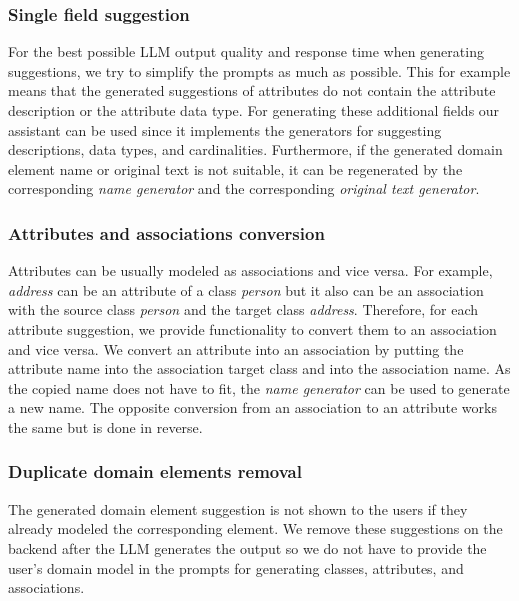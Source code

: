 \subsubsection{Single field suggestion}

For the best possible LLM output quality and response time when generating suggestions, we try to simplify the prompts as much as possible. This for example means that the generated suggestions of attributes do not contain the attribute description or the attribute data type. For generating these additional fields our assistant can be used since it implements the generators for suggesting descriptions, data types, and cardinalities. Furthermore, if the generated domain element name or original text is not suitable, it can be regenerated by the corresponding \emph{name generator} and the corresponding \emph{original text generator}.


\subsubsection{Attributes and associations conversion}
\label{sec:attributes_and_associations_conversion}

Attributes can be usually modeled as associations and vice versa. For example, \textit{address} can be an attribute of a class \textit{person} but it also can be an association with the source class \textit{person} and the target class \textit{address}. Therefore, for each attribute suggestion, we provide functionality to convert them to an association and vice versa. We convert an attribute into an association by putting the attribute name into the association target class and into the association name. As the copied name does not have to fit, the \emph{name generator} can be used to generate a new name. The opposite conversion from an association to an attribute works the same but is done in reverse.


\subsubsection{Duplicate domain elements removal}
\label{duplicate_domain_elements}

The generated domain element suggestion is not shown to the users if they already modeled the corresponding element. We remove these suggestions on the backend after the LLM generates the output so we do not have to provide the user's domain model in the prompts for generating classes, attributes, and associations.

